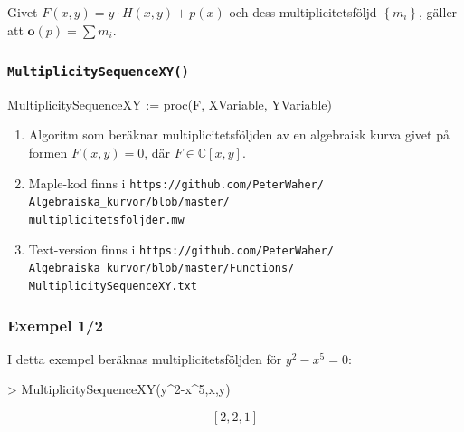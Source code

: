 \documentclass{beamer}
\begin{document}
\begin{frame}
	\frametitle{}
\begin{Corollary}
	Givet $F(x,y)=y\cdot H(x,y)+p(x)$ och dess multiplicitetsföljd $\left\{m_i\right\}$, gäller att $\mathbf{o}(p)=\sum m_i$.
\end{Corollary}

\vspace{20pt}

\vspace{20pt}
\end{frame}

\begin{frame}
	\frametitle{\texttt{MultiplicitySequenceXY()}}
	
	\begin{semiverbatim}
		MultiplicitySequenceXY := proc(F, XVariable, YVariable)
	\end{semiverbatim}
	
	\begin{enumerate}
		\item<1-> Algoritm som beräknar multiplicitetsföljden av en algebraisk kurva givet på formen $F(x, y) = 0$, där $F \in \mathbb{C}\left[x, y\right]$.
		
		\item<2-> Maple-kod finns i \texttt{https://github.com/PeterWaher/\\
			\qquad Algebraiska\_kurvor/blob/master/\\
			\qquad multiplicitetsfoljder.mw}
		
		\item<3-> Text-version finns i
		\texttt{https://github.com/PeterWaher/\\
			\qquad Algebraiska\_kurvor/blob/master/Functions/\\
			\qquad MultiplicitySequenceXY.txt} 
	\end{enumerate}
\end{frame}

\begin{frame}
	\frametitle{Exempel 1/2}
	\begin{example}
I detta exempel beräknas multiplicitetsföljden för $y^2 - x^5 = 0$:

\begin{semiverbatim}
> MultiplicitySequenceXY(y\^{}2-x\^{}5,x,y)
\end{semiverbatim}
\[\left[2, 2, 1\right]\]
	\end{example}
\end{frame}
\end{document}
